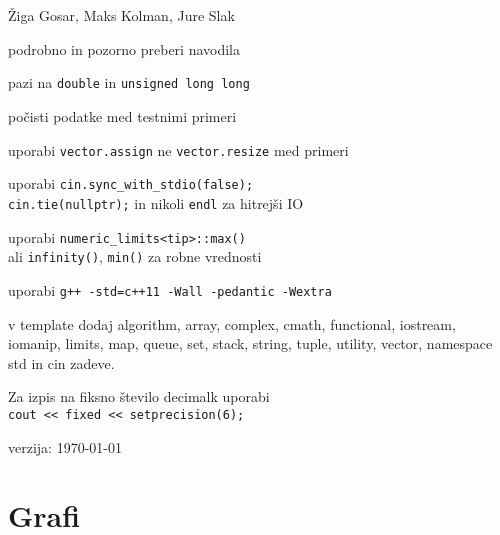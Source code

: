 \documentclass[a4paper,oneside,12pt]{article}
\title{\mytitle}
\author{Jure Slak}
\date{\today}
\newenvironment{itemize*}%
{
\vspace{-6pt}
\begin{itemize}
\setlength{\itemsep}{0pt}
\setlength{\parskip}{2pt}
}
{\end{itemize}}
\newcommand{\ull}{\texttt{unsigned long long}}
\begin{document}
\thispagestyle{empty}

\vspace*{\fill}
\begin{center}
  \\[6ex]
  \\[4ex]
  Žiga Gosar, Maks Kolman, Jure Slak
  \vfill
  \parbox{0.75\textwidth}{
  \begin{itemize*}
    \item podrobno in pozorno preberi navodila
    \item pazi na \texttt{double} in \ull
    \item počisti podatke med testnimi primeri
    \item uporabi \texttt{vector.assign} ne \texttt{vector.resize} med primeri
    \item uporabi \texttt{cin.sync\_with\_stdio(false);}\\
      \texttt{cin.tie(nullptr);} in nikoli \texttt{endl} za hitrejši IO
    \item uporabi \texttt{numeric\_limits<tip>::max()} \\ ali \texttt{infinity()},
      \texttt{min()} za robne vrednosti
    \item uporabi \texttt{g++ -std=c++11 -Wall -pedantic -Wextra}
    \item v template dodaj
      algorithm,
      array,
      complex,
      cmath,
      functional,
      iostream,
      iomanip,
      limits,
      map,
      queue,
      set,
      stack,
      string,
      tuple,
      utility,
      vector,
      namespace std in cin zadeve.
      \item Za izpis na fiksno število decimalk uporabi  \\ \texttt{cout
          \mbox{<}< fixed \mbox{<}< setprecision(6);}
  \end{itemize*}}
  \vfill
  verzija: \today
\end{center}

\newpage

\tableofcontents

\newpage

\section{Grafi}
\label{sec:grafi}
\end{document}
